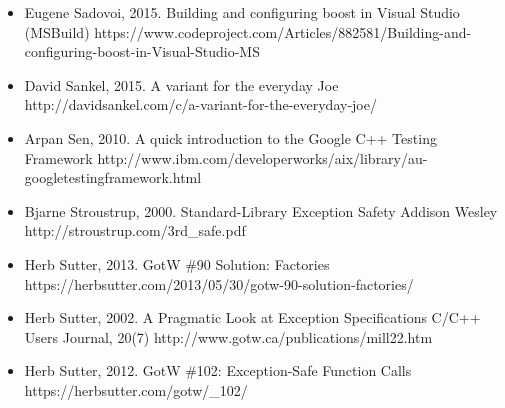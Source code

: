 \begin{itemize}

\item Eugene Sadovoi, 2015. Building and configuring boost in Visual Studio (MSBuild) https://\allowbreak{}www.\allowbreak{}codeproject.\allowbreak{}com/\allowbreak{}Articles/\allowbreak{}882581/\allowbreak{}Building-\allowbreak{}and-\allowbreak{}configuring-\allowbreak{}boost-\allowbreak{}in-\allowbreak{}Visual-\allowbreak{}Studio-\allowbreak{}MS



\item David Sankel, 2015. A variant for the everyday Joe http://\allowbreak{}davidsankel.\allowbreak{}com/\allowbreak{}c/\allowbreak{}a-\allowbreak{}variant-\allowbreak{}for-\allowbreak{}the-\allowbreak{}everyday-\allowbreak{}joe/



\item Arpan Sen, 2010. A quick introduction to the Google C++ Testing Framework http://\allowbreak{}www.\allowbreak{}ibm.\allowbreak{}com/\allowbreak{}developerworks/\allowbreak{}aix/\allowbreak{}library/\allowbreak{}au-\allowbreak{}googletestingframework.\allowbreak{}html



\item Bjarne Stroustrup, 2000. Standard-Library Exception Safety Addison Wesley http://\allowbreak{}stroustrup.\allowbreak{}com/\allowbreak{}3rd\_\allowbreak{}safe.\allowbreak{}pdf



\item Herb Sutter, 2013. GotW \#90 Solution: Factories https://\allowbreak{}herbsutter.\allowbreak{}com/\allowbreak{}2013/\allowbreak{}05/\allowbreak{}30/\allowbreak{}gotw-\allowbreak{}90-\allowbreak{}solution-\allowbreak{}factories/



\item Herb Sutter, 2002. A Pragmatic Look at Exception Specifications C/C++ Users Journal, 20(7) http://\allowbreak{}www.\allowbreak{}gotw.\allowbreak{}ca/\allowbreak{}publications/\allowbreak{}mill22.\allowbreak{}htm



\item Herb Sutter, 2012. GotW \#102: Exception-Safe Function Calls https://\allowbreak{}herbsutter.\allowbreak{}com/\allowbreak{}gotw/\_\allowbreak{}102/




\end{itemize}
